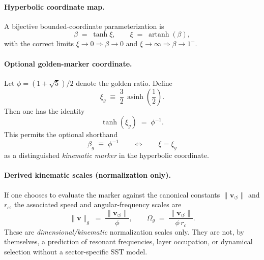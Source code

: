 \documentclass[10pt]{article}
\begin{document}
    \paragraph{Hyperbolic coordinate map.}
    A bijective bounded-coordinate parameterization is
    \begin{equation}
        \beta \;=\; \tanh \xi,
        \qquad
        \xi \;=\; \operatorname{artanh}(\beta),
        \label{eq:beta_tanh_xi_appendix}
    \end{equation}
    with the correct limits $\xi\to 0 \Rightarrow \beta\to 0$ and
    $\xi\to \infty \Rightarrow \beta\to 1^{-}$.

    \paragraph{Optional golden-marker coordinate.}
    Let $\phi=(1+\sqrt{5})/2$ denote the golden ratio. Define
    \begin{equation}
        \xi_g \;\equiv\; \frac{3}{2}\,\operatorname{asinh}\!\left(\frac{1}{2}\right).
        \label{eq:xi_g_def_appendix}
    \end{equation}
    Then one has the identity
    \begin{equation}
        \tanh(\xi_g) \;=\; \phi^{-1}.
        \label{eq:tanh_xig_phi_appendix}
    \end{equation}
    This permits the optional shorthand
    \begin{equation}
        \beta_g \;\equiv\; \phi^{-1}
        \qquad\Longleftrightarrow\qquad
        \xi=\xi_g
    \end{equation}
    as a distinguished \emph{kinematic marker} in the hyperbolic coordinate.

    \paragraph{Derived kinematic scales (normalization only).}
    If one chooses to evaluate the marker against the canonical constants
    $\lVert \mathbf{v}_{\!\boldsymbol{\circlearrowleft}} \rVert$ and $r_c$, the associated
    speed and angular-frequency scales are
    \begin{equation}
        \lVert \mathbf{v} \rVert_g \;=\; \frac{\lVert \mathbf{v}_{\!\boldsymbol{\circlearrowleft}} \rVert}{\phi},
        \qquad
        \Omega_g \;=\; \frac{\lVert \mathbf{v}_{\!\boldsymbol{\circlearrowleft}} \rVert}{\phi\,r_c}.
        \label{eq:golden_marker_scales_appendix}
    \end{equation}
    These are \emph{dimensional/kinematic} normalization scales only. They are not,
    by themselves, a prediction of resonant frequencies, layer occupation, or
    dynamical selection without a sector-specific SST model.
\end{document}
